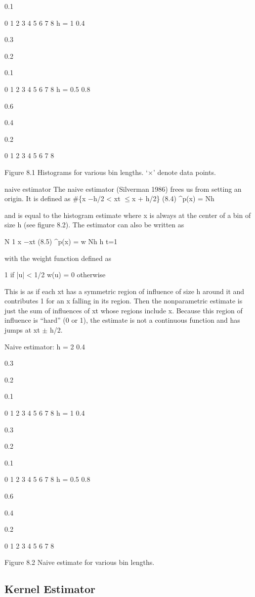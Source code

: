 0.1

0 1 2 3 4 5 6 7 8 h = 1 0.4

0.3

0.2

0.1

0 1 2 3 4 5 6 7 8 h = 0.5 0.8

0.6

0.4

0.2

0 1 2 3 4 5 6 7 8

Figure 8.1 Histograms for various bin lengths. ‘$\times$’ denote data points.

naive estimator The naive estimator (Silverman 1986) frees us from setting an origin. It is defined as \#\{x $-$h/2 < xt $\leq$x + h/2\} (8.4) \textasciicircum{}p(x) = Nh

and is equal to the histogram estimate where x is always at the center of a bin of size h (see figure 8.2). The estimator can also be written as

N 1 x $-$xt (8.5) \textasciicircum{}p(x) = w Nh h t=1

with the weight function defined as

1 if |u| < 1/2 w(u) = 0 otherwise

This is as if each xt has a symmetric region of influence of size h around it and contributes 1 for an x falling in its region. Then the nonparametric estimate is just the sum of influences of xt whose regions include x. Because this region of influence is “hard” (0 or 1), the estimate is not a continuous function and has jumps at xt $\pm$ h/2.

Naive estimator: h = 2 0.4

0.3

0.2

0.1

0 1 2 3 4 5 6 7 8 h = 1 0.4

0.3

0.2

0.1

0 1 2 3 4 5 6 7 8 h = 0.5 0.8

0.6

0.4

0.2

0 1 2 3 4 5 6 7 8

Figure 8.2 Naive estimate for various bin lengths.

\subsection{Kernel Estimator}

